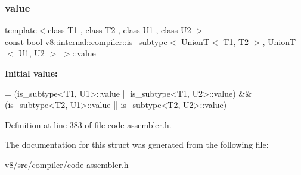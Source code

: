 \subsubsection{\texorpdfstring{value}{value}}
{\footnotesize\ttfamily template$<$class T1 , class T2 , class U1 , class U2 $>$ \\
const \mbox{\hyperlink{classbool}{bool}} \mbox{\hyperlink{structv8_1_1internal_1_1compiler_1_1is__subtype}{v8\+::internal\+::compiler\+::is\+\_\+subtype}}$<$ \mbox{\hyperlink{structv8_1_1internal_1_1UnionT}{UnionT}}$<$ T1, T2 $>$, \mbox{\hyperlink{structv8_1_1internal_1_1UnionT}{UnionT}}$<$ U1, U2 $>$ $>$\+::value\hspace{0.3cm}{\ttfamily [static]}}

{\bfseries Initial value\+:}
\begin{DoxyCode}
=
      (is\_subtype<T1, U1>::value || is\_subtype<T1, U2>::value) &&
      (is\_subtype<T2, U1>::value || is\_subtype<T2, U2>::value)
\end{DoxyCode}


Definition at line 383 of file code-\/assembler.\+h.



The documentation for this struct was generated from the following file\+:\begin{DoxyCompactItemize}
\item 
v8/src/compiler/code-\/assembler.\+h\end{DoxyCompactItemize}
